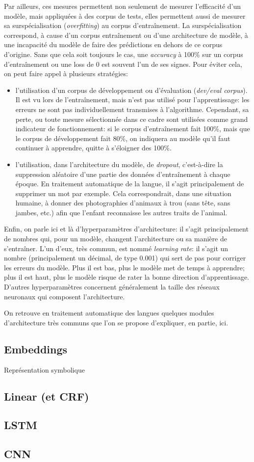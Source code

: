 Par ailleurs, ces mesures permettent non seulement de mesurer l'efficacité d'un modèle, mais appliquées à des corpus de tests, elles permettent aussi de mesurer sa surspécialisation\label{deep-learning:overfitting} (\textit{overfitting}) au corpus d'entraînement. La surspécialisation correspond, à cause d'un corpus entraînement ou d'une architecture de modèle, à une incapacité du modèle de faire des prédictions en dehors de ce corpus d'origine. Sans que cela soit toujours le cas, une \textit{accuracy} à 100\% sur un corpus d'entraînement ou une loss de 0 est souvent l'un de ses signes. Pour éviter cela, on peut faire appel à plusieurs stratégies:
\begin{itemize}
    \item l'utilisation d'un corpus de développement ou d'évaluation (\textit{dev/eval corpus}). Il est vu lors de l'entraînement, mais n'est pas utilisé pour l'apprentissage: les erreurs ne sont pas individuellement transmises à l'algorithme. Cependant, sa perte, ou toute mesure sélectionnée dans ce cadre sont utilisées comme grand indicateur de fonctionnement: si le corpus d'entraînement fait 100\%, mais que le corpus de développement fait 80\%, on indiquera au modèle qu'il faut continuer à apprendre, quitte à s'éloigner des 100\%.
    \item l'utilisation, dans l'architecture du modèle, de \textit{dropout}, c'est-à-dire la suppression aléatoire d'une partie des données d'entraînement à chaque époque. En traitement automatique de la langue, il s'agit principalement de supprimer un mot par exemple. Cela correspondrait, dans une situation humaine, à donner des photographies d'animaux à trou (sans tête, sans jambes, etc.) afin que l'enfant reconnaisse les autres traits de l'animal. %
\end{itemize}

Enfin, on parle ici et là d'hyperparamètres d'architecture: il s'agit principalement de nombres qui, pour un modèle, changent l'architecture ou sa manière de s'entraîner. L'un d'eux, très commun, est nommé \textit{learning rate}: il s'agit un nombre (principalement un décimal, de type 0.001) qui sert de pas pour corriger les erreurs du modèle. Plus il est bas, plus le modèle met de temps à apprendre; plus il est haut, plus le modèle risque de rater la bonne direction d'apprentissage. D'autres hyperparamètres concernent généralement la taille des réseaux neuronaux qui composent l'architecture. 

On retrouve en traitement automatique des langues quelques modules d'architecture très communs que l'on se propose d'expliquer, en partie, ici.

\subsection{Embeddings}
\label{deep-learning:embeddings}

Représentation symbolique
\subsection{Linear (et CRF)}

\subsection{LSTM}

\subsection{CNN}